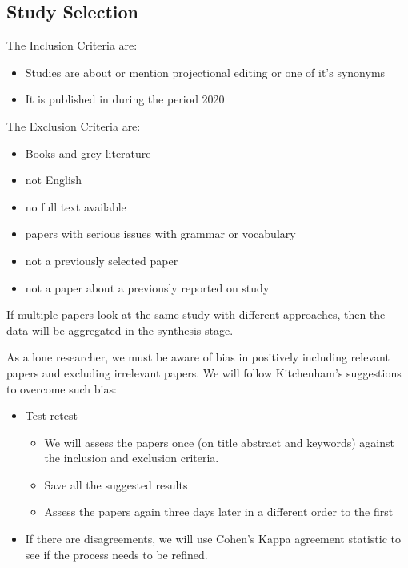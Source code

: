 \subsection{Study Selection}

The Inclusion Criteria are:
\begin{itemize}
       \item Studies are about or mention projectional editing or one of it's synonyms
       \item It is published in during the period 2020
\end{itemize}

The Exclusion Criteria are:
\begin{itemize}
       \item Books and grey literature
       \item not English
       \item no full text available
       \item papers with serious issues with grammar or vocabulary
       \item not a previously selected paper
       \item not a paper about a previously reported on study
\end{itemize}

If multiple papers look at the same study with different approaches, then the data will be aggregated in the synthesis stage.

As a lone researcher, we must be aware of bias in positively including relevant papers and excluding irrelevant papers.  
We will follow Kitchenham's suggestions to overcome such bias:
\begin{itemize}
       \item Test-retest 
       \begin{itemize}
              \item We will assess the papers once (on title abstract and keywords) against the inclusion and exclusion criteria.
              \item Save all the suggested results
              \item Assess the papers again three days later in a different order to the first  
       \end{itemize}
       \item If there are disagreements, we will use Cohen's Kappa agreement statistic \cite{Cohen_1960} to see if the process needs to be refined.
\end{itemize} 

